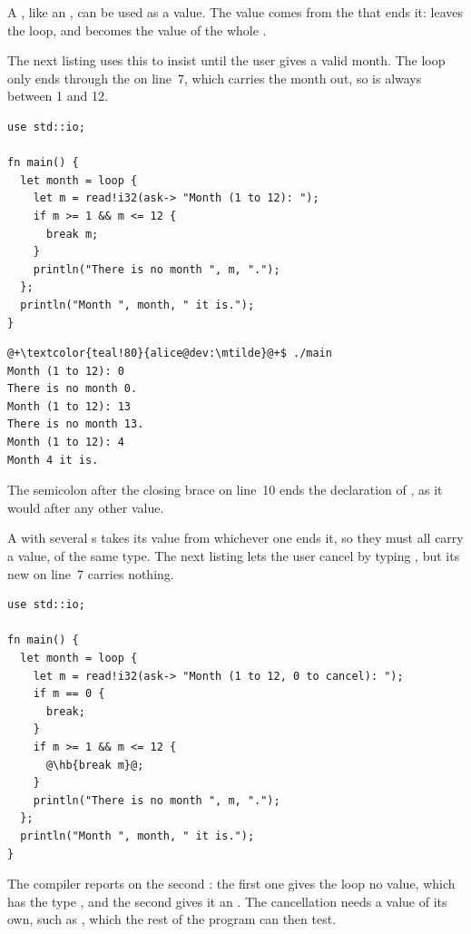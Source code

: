 A , like an , can be used as a value. The value comes from
the  that ends it:  leaves the loop, and 
becomes the value of the whole .

The next listing uses this to insist until the user gives a valid month. The
loop only ends through the  on line~7, which carries the month out,
so  is always between 1 and 12.

\begin{lstlisting}[style=coloredverbatim, caption=A loop whose value comes from \token{break}, label=lst:control:loop_value]
use std::io;

fn main() {
  let month = loop {
    let m = read!i32(ask-> "Month (1 to 12): ");
    if m >= 1 && m <= 12 {
      break m;
    }
    println("There is no month ", m, ".");
  };
  println("Month ", month, " it is.");
}
\end{lstlisting}
\vspace{-10pt}%
\begin{lstlisting}[style=bashVerb, escapechar=@+]
@+\textcolor{teal!80}{alice@dev:\mtilde}@+$ ./main
Month (1 to 12): 0
There is no month 0.
Month (1 to 12): 13
There is no month 13.
Month (1 to 12): 4
Month 4 it is.
\end{lstlisting}

The semicolon after the closing brace on line~10 ends the declaration of
, as it would after any other value.

A  with several s takes its value from whichever one
ends it, so they must all carry a value, of the same type. The next listing
lets the user cancel by typing , but its new  on line~7
carries nothing.

\begin{lstlisting}[style=coloredverbatimError, escapechar=@, caption=Two \token{break}s that do not agree]
use std::io;

fn main() {
  let month = loop {
    let m = read!i32(ask-> "Month (1 to 12, 0 to cancel): ");
    if m == 0 {
      break;
    }
    if m >= 1 && m <= 12 {
      @\hb{break m}@;
    }
    println("There is no month ", m, ".");
  };
  println("Month ", month, " it is.");
}
\end{lstlisting}

The compiler reports  on the
second
: the first one gives the loop no value, which has the type
, and the second gives it an . The cancellation needs a value of its own, such as
, which the rest of the program can then test.
